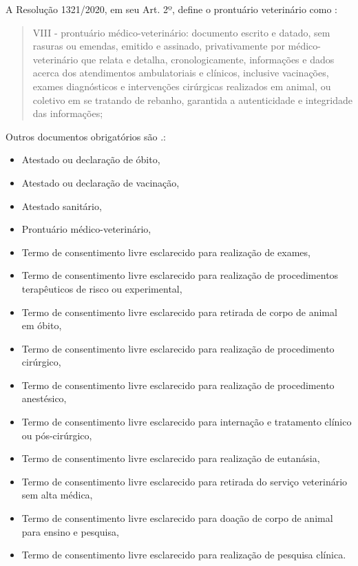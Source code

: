 \documentclass[
    12pt,               %
    openright,          %
    oneside,
    a4paper,            %
    MODELO,             %
    TODO,               %
    english,            %
    brazil              %
    ]{ifsp-spo-inf-ctds}
\begin{document}
        A Resolução 1321/2020, em seu Art. 2º, define o prontuário veterinário como \cite {doc_obrig}: 
    
        \begin{quote}
            VIII - prontuário médico-veterinário: documento escrito e datado, sem rasuras ou emendas, emitido e assinado, privativamente por médico-veterinário que relata e detalha, cronologicamente, informações e dados acerca dos atendimentos ambulatoriais e clínicos, inclusive vacinações, exames diagnósticos e intervenções cirúrgicas realizados em animal, ou coletivo em se tratando de rebanho, garantida a autenticidade e integridade das informações;
        \end{quote}
    
        Outros documentos obrigatórios são \cite{doc_obrig}.: 
    
        \begin{itemize}
            \item
            Atestado ou declaração de óbito,
            \item
            Atestado ou declaração de vacinação,
            \item
            Atestado sanitário,
            \item
            Prontuário médico-veterinário,
            \item
            Termo de consentimento livre esclarecido para realização de exames, 
            \item
            Termo de consentimento livre esclarecido para realização de procedimentos terapêuticos de risco ou experimental, 
            \item
            Termo de consentimento livre esclarecido para retirada de corpo de animal em óbito, 
            \item
            Termo de consentimento livre esclarecido para realização de procedimento cirúrgico, 
            \item
            Termo de consentimento livre esclarecido para realização de procedimento anestésico, 
            \item
            Termo de consentimento livre esclarecido para internação e tratamento clínico ou pós-cirúrgico, 
            \item
            Termo de consentimento livre esclarecido para realização de eutanásia, 
            \item
            Termo de consentimento livre esclarecido para retirada do serviço veterinário sem alta médica, 
            \item
            Termo de consentimento livre esclarecido para doação de corpo de animal para ensino e pesquisa, 
            \item
            Termo de consentimento livre esclarecido para realização de pesquisa clínica.
        \end{itemize}
    
\end{document}
